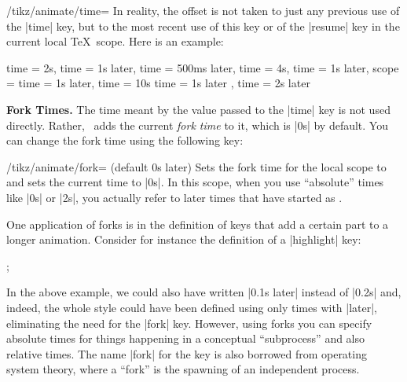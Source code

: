\begin{key}{/tikz/animate/time=}
    In reality, the offset is not taken to just any previous use of the |time|
    key, but to the most recent use of this key or of the |resume| key in the
    current local \TeX\ scope. Here is an example:
\begin{codeexample}
time = 2s,
time = 1s later,    %
time = 500ms later, %
time = 4s,
time = 1s later,    %
scope = {           %
  time = 1s later,  %
  time = 10s
  time = 1s later   %
},                  %
time = 2s later     %
\end{codeexample}

    \medskip\textbf{Fork Times.}
    The time meant by the value  passed to the |time| key is not
    used directly. Rather, \tikzname\ adds the current \emph{fork time} to it,
    which is |0s| by default. You can change the fork time using the following
    key:
    \begin{key}{/tikz/animate/fork= (default 0s later)}
        Sets the fork time for the local scope to  and sets the current
        time to |0s|. In this scope, when you use ``absolute'' times like |0s|
        or |2s|, you actually refer to later times that have started as
        .

        One application of forks is in the definition of keys that add a
        certain part to a longer animation. Consider for instance the
        definition of a |highlight| key:
\begin{codeexample}[imagesource={standalone/pgfmanual-en-tikz-animations-animation-14.svg}]
\tikz [animate/highlight/.style = {
    scope = { fork = #1,
              :fill = { 0s = "black", 0.1s = "white", 0.2s = "black"} }
  }]
  ;
\end{codeexample}
        In the above example, we could also have written |0.1s later| instead
        of |0.2s| and, indeed, the whole style could have been defined using
        only times with |later|, eliminating the need for the |fork| key.
        However, using forks you can specify absolute times for things
        happening in a conceptual ``subprocess'' and also relative times. The
        name |fork| for the key is also borrowed from operating system theory,
        where a ``fork'' is the spawning of an independent process.
    \end{key}


\end{key}
